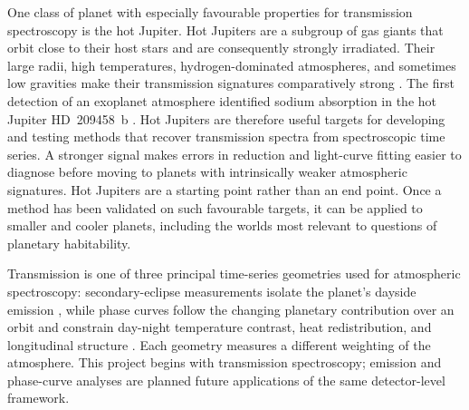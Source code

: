 One class of planet with especially favourable properties for transmission
spectroscopy is the hot Jupiter. Hot Jupiters are a subgroup of gas giants that
orbit close to their host stars and are consequently strongly irradiated. Their
large radii, high temperatures, hydrogen-dominated atmospheres, and sometimes
low gravities make their transmission signatures comparatively strong
\citep{Brown2001,Madhusudhan2019}. The
first detection of an exoplanet atmosphere identified sodium absorption in the
hot Jupiter
HD~209458~b \citep{CharbonneauEtAl2002}. Hot Jupiters are therefore
useful targets for developing and testing methods that recover transmission
spectra from spectroscopic time series. A stronger signal makes errors in
reduction and light-curve fitting easier to diagnose before moving to planets
with intrinsically weaker atmospheric signatures. Hot Jupiters are a starting
point rather than an end point. Once a method has been validated on such
favourable targets, it can be applied to smaller and cooler planets, including
the worlds most relevant to questions of planetary habitability.


Transmission is one of three principal time-series geometries used for
atmospheric spectroscopy: secondary-eclipse measurements isolate the planet's
dayside emission
\citep{DemingEtAl2005,CoulombeEtAl2023,GressierEtAl2024}, while phase curves
follow the changing planetary contribution over an orbit and constrain
day-night temperature contrast, heat redistribution, and longitudinal
structure
\citep{KnutsonEtAl2007,MikalEvansEtAl2023,KemptonEtAl2023,
SplinterEtAl2025}. Each geometry measures a different weighting of the
atmosphere. This project begins with transmission spectroscopy; emission and
phase-curve analyses are planned future applications of the same
detector-level framework.

